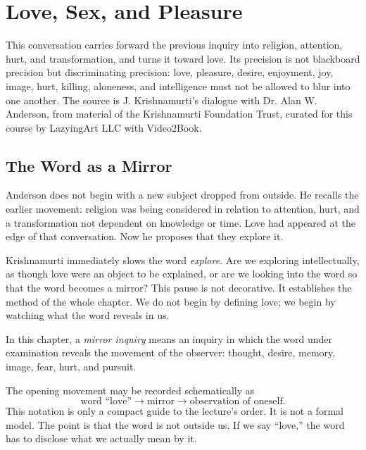 \chapter{Love, Sex, and Pleasure}

This conversation carries forward the previous inquiry into religion, attention, hurt, and transformation, and turns it toward love. Its precision is not blackboard precision but discriminating precision: love, pleasure, desire, enjoyment, joy, image, hurt, killing, aloneness, and intelligence must not be allowed to blur into one another. The source is J. Krishnamurti's dialogue with Dr. Alan W. Anderson, from material of the Krishnamurti Foundation Trust, curated for this course by LazyingArt LLC with Video2Book.

\section{The Word as a Mirror}

Anderson does not begin with a new subject dropped from outside. He recalls the earlier movement: religion was being considered in relation to attention, hurt, and a transformation not dependent on knowledge or time. Love had appeared at the edge of that conversation. Now he proposes that they explore it.

Krishnamurti immediately slows the word \emph{explore}. Are we exploring intellectually, as though love were an object to be explained, or are we looking into the word so that the word becomes a mirror? This pause is not decorative. It establishes the method of the whole chapter. We do not begin by defining love; we begin by watching what the word reveals in us.

\begin{definition}
In this chapter, a \emph{mirror inquiry} means an inquiry in which the word under examination reveals the movement of the observer: thought, desire, memory, image, fear, hurt, and pursuit.
\end{definition}

The opening movement may be recorded schematically as
\begin{equation}
\text{word ``love''}
\longrightarrow
\text{mirror}
\longrightarrow
\text{observation of oneself}.
\end{equation}
This notation is only a compact guide to the lecture's order. It is not a formal model. The point is that the word is not outside us. If we say ``love,'' the word has to disclose what we actually mean by it.

